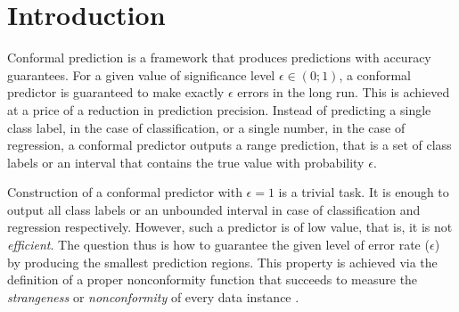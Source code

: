\section{Introduction}
\label{sec:intro}

Conformal prediction \citep{shafer2008tutorial,vovk2005algorithmic} is a 
framework that produces predictions with accuracy guarantees.
For a given value of significance level $\epsilon \in (0;1)$, a conformal predictor is guaranteed to make exactly $\epsilon$ errors in the long run.
This is achieved at a price of a reduction in prediction precision. 
Instead of predicting a single class label, in the case of classification, or a single
number, in the case of regression, a conformal predictor outputs a range prediction, 
that is a set of class labels or an
interval that contains the true value with probability $\epsilon$.

Construction of a conformal predictor with $\epsilon = 1$ is a trivial task.
It is enough to output all class labels or an unbounded interval in case of classification and
regression respectively.
However, such a predictor is of low value, that is, it is not \textit{efficient}.
The question thus is how to guarantee the 
given level of error rate ($\epsilon$) by producing the smallest prediction regions.
This property is achieved via the definition of a proper nonconformity function that 
succeeds to measure the \textit{strangeness} or \textit{nonconformity} of every data
instance \citep{shafer2008tutorial}.

